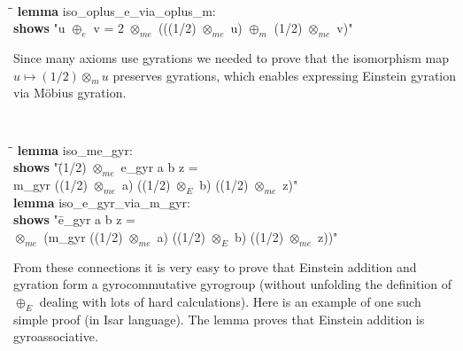 \documentclass[a4paper]{article}
\newcommand{\tab}{\hspace{5mm}}
\theoremstyle{definition}
\begin{document}
{\tt
\begin{small}
\begin{tabbing}
  \tab\=\tab\=\kill
{\bf lemma} iso\_oplus\_e\_via\_oplus\_m:\\
\> {\bf  shows} "u $\oplus_e$ v = 2 $\otimes_{me}$ (((1/2) $\otimes_{me}$ u) $\oplus_m$ (1/2) $\otimes_{me}$ v)"
\end{tabbing}
\end{small}
}


Since many axioms use gyrations we needed to prove that the
isomorphism map $u \mapsto (1/2)\otimes_m u$ preserves gyrations,
which enables expressing Einstein gyration via M\"obius gyration.

{\tt
\begin{small}
  \begin{tabbing}
\tab\=\tab\=\kill
{\bf lemma} iso\_me\_gyr:\\
\> {\bf shows} "\=(1/2) $\otimes_{me}$ e\_gyr a b z =\\
\>\>m\_gyr ((1/2) $\otimes_{me}$ a) ((1/2) $\otimes_E$ b) ((1/2) $\otimes_{me}$ z)"\\
{\bf lemma} iso\_e\_gyr\_via\_m\_gyr:\\
\> {\bf shows} "\= e\_gyr a b z =\\
\> $\otimes_{me}$ (m\_gyr ((1/2) $\otimes_{me}$ a) ((1/2) $\otimes_E$ b) ((1/2) $\otimes_{me}$ z))"
\end{tabbing}
\end{small}
}


From these connections it is very easy to prove that Einstein addition
and gyration form a gyrocommutative gyrogroup (without unfolding the
definition of $\oplus_E$ dealing with lots of hard calculations).
Here is an example of one such simple proof (in Isar language). The
lemma proves that Einstein addition is gyroassociative.
\end{document}
